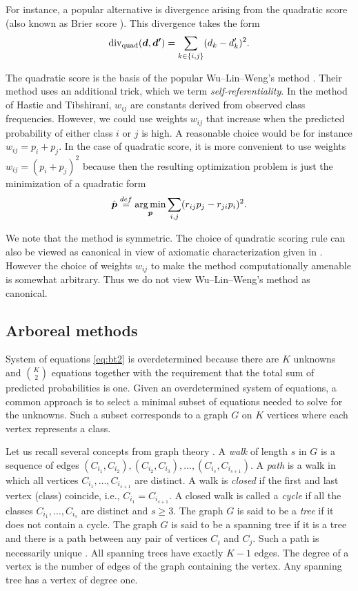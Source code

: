 For instance, a popular alternative is divergence arising from the quadratic  score \cite{gneiting2007strictly} (also known as Brier score \cite{brier1950verification}). This divergence takes the form
$$
\operatorname*{div}\nolimits_\textrm{quad} (\boldsymbol{d}, \boldsymbol{d'})= \sum_{k\in\{i,j\}} (d_k - d'_k)^2.
$$

The quadratic score is the basis of the popular Wu--Lin--Weng's method \cite{wu2004probability}. 
Their method uses an additional trick, which we term \emph{self-referentiality}. In the method of Hastie and Tibshirani, $w_{ij}$ are constants derived from observed class frequencies. However, we could use weights $w_{ij}$ that increase when the predicted probability of either class $i$ or $j$ is high. A reasonable choice would be for instance $w_{ij}= p_i + p_j$. In the case of quadratic score, 
it is more convenient to use weights $w_{ij} = (p_i + p_j)^2$ because then 
the resulting optimization problem is just the minimization of a quadratic form
\begin{align*}
\hat{\boldsymbol{p}} \stackrel{def}{=} \operatorname*{arg\,min}_{\boldsymbol{p}} \sum_{i,j} (r_{ij}p_j - r_{ji}p_i)^2.
\end{align*}

We note that the method is symmetric. The choice of quadratic scoring rule can also be viewed as canonical in view of axiomatic characterization given in  \cite{selten1998axiomatic}.  However the choice of weights $w_{ij}$ to make the method computationally amenable is somewhat arbitrary. Thus we do not view Wu--Lin--Weng's method as canonical.

\subsection{Arboreal methods}

System of equations \eqref{eq:bt2} is overdetermined because there are $K$ unknowns and $\binom{K}{2}$ equations together with the requirement that the total sum of predicted probabilities is one. 
Given an overdetermined system of equations, a common approach is to select a minimal subset of equations needed to solve for the unknowns. 
Such a subset corresponds to a graph $G$ on $K$ vertices where each vertex represents a class.  

Let us recall several concepts from graph theory \cite{harary1969graph}. 
A \emph{walk} of length $s$ in $G$ is a sequence of edges 
$(C_{i_1}, C_{i_2}), (C_{i_2}, C_{i_3}), \ldots,  (C_{i_{s}}, C_{i_{s+1}})$. 
A \emph{path} is a walk in which all vertices $C_{i_1}, \ldots, C_{i_{s+1}}$ are distinct.
A walk is \emph{closed} if the first and last vertex (class) coincide, i.e., $C_{i_1} = C_{i_{s+1}}$. 
A closed walk is called a \emph{cycle} if all the classes
$C_{i_1}, \ldots, C_{i_s}$ are distinct and $s\geq 3$. 
The graph $G$ is said to be a \emph{tree} if it does not contain a cycle.
The graph $G$ is said to be a spanning tree if it is a tree and  there is a path between any pair of vertices $C_i$ and $C_j$. Such a path is necessarily unique \cite[Theorem 4.1]{harary1969graph}. 
All spanning trees have exactly $K-1$ edges. The degree of a vertex is the number of edges of the graph 
containing the vertex. Any spanning tree has a vertex of degree one.

